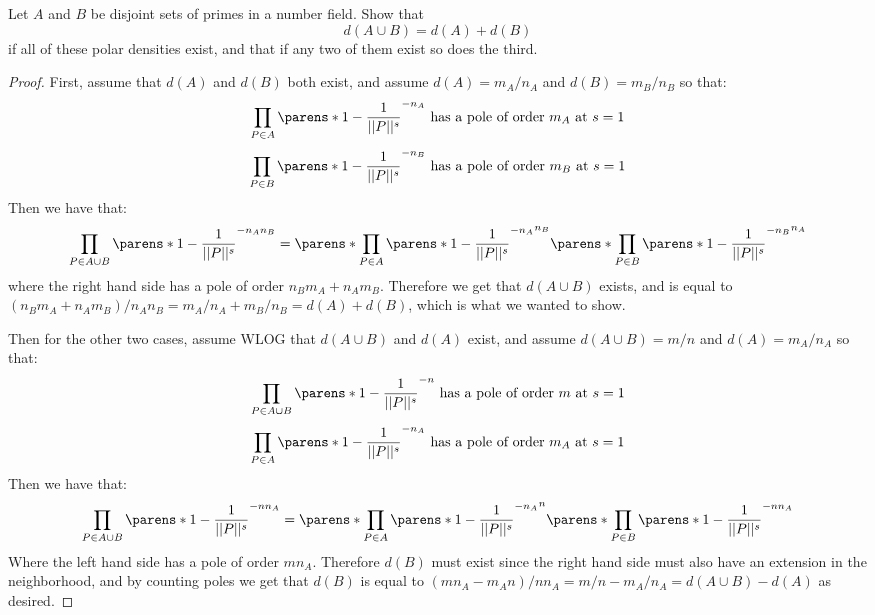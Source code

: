 \documentclass[11pt]{article}
\begin{document}
Let $A$ and $B$ be disjoint sets of primes in a number field. Show that $$d(A \cup B) = d(A) + d(B)$$ if all of these polar densities exist, and that if any two of them exist so does the third.
\begin{proof}
  First, assume that $d(A)$ and $d(B)$ both exist, and assume $d(A) = m_A/n_A$ and $d(B) = m_B/n_B$ so that:
  \begin{equation*}
    \prod_{P \in A} \parens*{1 - \frac{1}{||P||^s}}^{-n_A} \text{ has a pole of order } m_A \text{ at } s = 1
  \end{equation*}
  \begin{equation*}
    \prod_{P \in B} \parens*{1 - \frac{1}{||P||^s}}^{-n_B} \text{ has a pole of order } m_B \text{ at } s = 1
  \end{equation*}
  Then we have that:
  \begin{equation*}
    \prod_{P \in A \cup B} \parens*{1 - \frac{1}{||P||^s}}^{-n_A n_B}
    = \parens*{\prod_{P \in A} \parens*{1 - \frac{1}{||P||^s}}^{-n_A}}^{n_B}
    \parens*{\prod_{P \in B} \parens*{1 - \frac{1}{||P||^s}}^{-n_B}}^{n_A}
  \end{equation*}
  where the right hand side has a pole of order $n_Bm_A + n_Am_B$.
  Therefore we get that $d(A \cup B)$ exists, and is equal to $(n_Bm_A + n_Am_B)/n_An_B = m_A/n_A + m_B/n_B = d(A) + d(B)$, which is what we wanted to show.

  Then for the other two cases, assume WLOG that $d(A \cup B)$ and $d(A)$ exist, and assume $d(A \cup B) = m/n$ and $d(A) = m_A/n_A$ so that:
  \begin{equation*}
    \prod_{P \in A \cup B} \parens*{1 - \frac{1}{||P||^s}}^{-n} \text{ has a pole of order } m \text{ at } s = 1
  \end{equation*}
  \begin{equation*}
    \prod_{P \in A} \parens*{1 - \frac{1}{||P||^s}}^{-n_A} \text{ has a pole of order } m_A \text{ at } s = 1
  \end{equation*}
  Then we have that:
  \begin{equation*}
    \prod_{P \in A \cup B} \parens*{1 - \frac{1}{||P||^s}}^{-n n_A}
    = \parens*{\prod_{P \in A} \parens*{1 - \frac{1}{||P||^s}}^{-n_A}}^{n}
    \parens*{\prod_{P \in B} \parens*{1 - \frac{1}{||P||^s}}^{-n n_A}}
  \end{equation*}
  Where the left hand side has a pole of order $m n_A$.
  Therefore $d(B)$ must exist since the right hand side must also have an extension in the neighborhood, and by counting poles we get that $d(B)$ is equal to $(mn_A - m_An)/nn_A = m/n - m_A/n_A = d(A \cup B) - d(A)$ as desired.
\end{proof}
\end{document}
